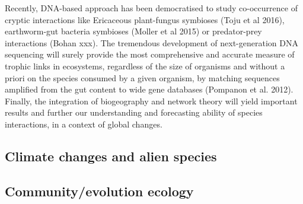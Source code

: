 Recently, DNA-based approach has been democratised to study co-occurrence of
cryptic interactions like Ericaceous plant-fungus symbioses (Toju et al 2016),
earthworm-gut bacteria symbioses (Moller et al 2015) or predator-prey
interactions (Bohan xxx). The tremendous development of next-generation DNA
sequencing will surely provide the most comprehensive and accurate measure of
trophic links in ecosystems, regardless of the size of organisms and without a
priori on the species consumed by a given organism, by matching sequences
amplified from the gut content to wide gene databases (Pompanon et al. 2012).
Finally, the integration of biogeography and network theory will yield important
results and further our understanding and forecasting ability of species
interactions, in a context of global changes.

\subsection*{Climate changes and alien species}
\label{climate-changes-and-alien-species}

\subsection*{Community/evolution ecology}
\label{communityevolution-ecology}






